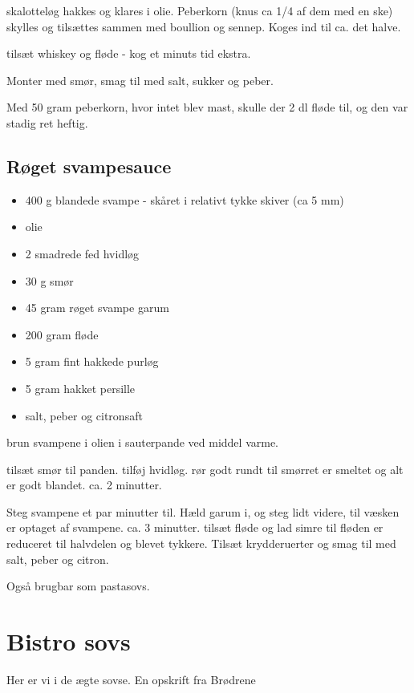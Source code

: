 \documentclass[
]{book}
\providecommand{\tightlist}{%
  \setlength{\itemsep}{0pt}\setlength{\parskip}{0pt}}
\begin{document}
skalotteløg hakkes og klares i olie.
Peberkorn (knus ca 1/4 af dem med en ske) skylles og tilsættes
sammen med boullion og sennep. Koges ind til ca. det halve.

tilsæt whiskey og fløde - kog et minuts tid ekstra.

Monter med smør, smag til med salt, sukker og peber.

Med 50 gram peberkorn, hvor intet blev mast, skulle der
2 dl fløde til, og den var stadig ret heftig.

\hypertarget{ruxf8get-svampesauce}{%
\subsection{Røget svampesauce}\label{ruxf8get-svampesauce}}

\begin{itemize}
\tightlist
\item
  400 g blandede svampe - skåret i relativt tykke skiver (ca 5 mm)
\item
  olie
\item
  2 smadrede fed hvidløg
\item
  30 g smør
\item
  45 gram røget svampe garum
\item
  200 gram fløde
\item
  5 gram fint hakkede purløg
\item
  5 gram hakket persille
\item
  salt, peber og citronsaft
\end{itemize}

brun svampene i olien i sauterpande ved middel varme.

tilsæt smør til panden. tilføj hvidløg. rør godt rundt til smørret er smeltet og alt er godt
blandet. ca. 2 minutter.

Steg svampene et par minutter til. Hæld garum i, og steg lidt videre, til
væsken er optaget af svampene. ca. 3 minutter.
tilsæt fløde og lad simre til fløden er reduceret til halvdelen og blevet tykkere.
Tilsæt krydderuerter og smag til med salt, peber og citron.

Også brugbar som pastasovs.

\hypertarget{bistro-sovs}{%
\section{Bistro sovs}\label{bistro-sovs}}

Her er vi i de ægte sovse. En opskrift fra Brødrene
\end{document}
